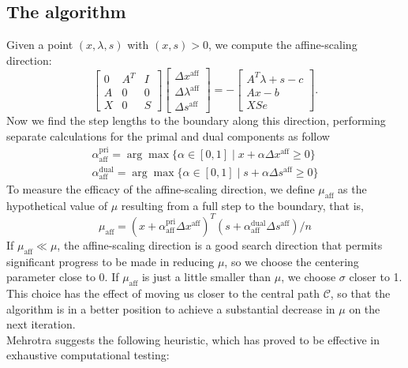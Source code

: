 \documentclass[a4paper,10 pt,titlepage,twoside]{book}
\theoremstyle{plain}
\theoremstyle{definition}
\theoremstyle{remark}
\begin{document}
\subsection*{The algorithm}
Given a point $(x, \lambda, s)$ with $(x, s)> 0$, we compute the affine-scaling direction:
\begin{equation}\label{(A)}
\begin{bmatrix}
0&A^{T}&I \\A&0&0\\X&0&S
\end{bmatrix}\begin{bmatrix}
\Delta x^{\text{aff}}\\\Delta\lambda^{\text{aff}}\\\Delta s^{\text{aff}}
\end{bmatrix}=-\begin{bmatrix}
A^{T}\lambda+s-c\\Ax-b\\XSe
\end{bmatrix}.
\end{equation}
Now we find the step lengths to the boundary along this direction, performing separate calculations for the primal and dual components as follow
\begin{align*}
\alpha_{\text{aff}}^{\text{pri}}=\arg\max\{\alpha\in[0,1]\;|\;x +\alpha\Delta x^{\text{aff}}\geq 0\}\\
\alpha_{\text{aff}}^{\text{dual}}=\arg\max\{\alpha\in[0,1]\;|\;s +\alpha\Delta s^{\text{aff}}\geq 0\}
\end{align*}
To measure the efficacy of the affine-scaling direction, we define $\mu_{\text{aff}}$ as the hypothetical value of $\mu$ resulting from a full step to the boundary, that is,
\begin{equation*}
	\mu_{\text{aff}}= (x+\alpha_{\text{aff}}^{\text{pri}}\Delta x^{\text{aff}})^{T}(s+\alpha_{\text{aff}}^{\text{dual}}\Delta s^{\text{aff}})/n
\end{equation*}
If $\mu_{\text{aff}}\ll\mu$, the affine-scaling direction is a good search direction that permits significant progress to be made in reducing $\mu$, so we choose the centering parameter close to 0. If $\mu_{\text{aff}}$ is just a little smaller than $\mu$, we choose $\sigma$ closer to 1. This choice has the effect of moving us closer  to the central path $\mathcal{C}$, so that the algorithm is in a better position to achieve a substantial decrease in $\mu$ on the next iteration.\\
Mehrotra \cite{MER} suggests the following heuristic, which has proved to be effective in exhaustive computational testing:
\end{document}
